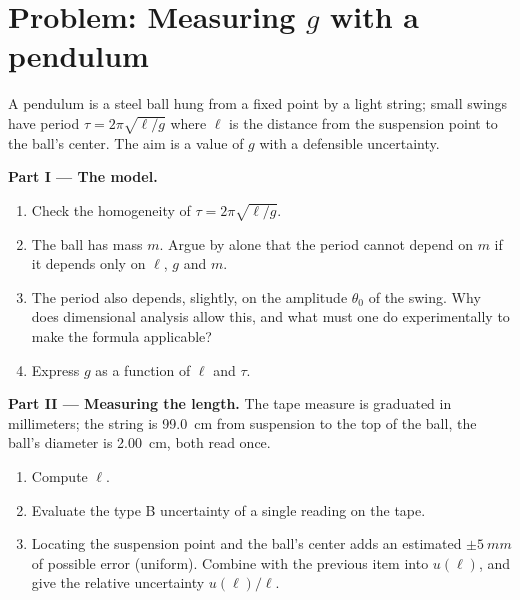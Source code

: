 \section{Problem: Measuring $g$ with a pendulum}

\begin{problem}
\label{pb:b1:units-dimensions:1}
A pendulum is a steel ball hung from a fixed point by a light string;
small swings have period $\tau = 2\pi\sqrt{\ell/g}$ where $\ell$ is the
distance from the suspension point to the ball's center. The aim is a
value of $g$ with a defensible uncertainty.

\medskip
\noindent\textbf{Part I --- The model.}
\begin{enumerate}
  \item Check the homogeneity of $\tau = 2\pi\sqrt{\ell/g}$.
  \item The ball has mass $m$. Argue by  alone that the
        period cannot depend on $m$ if it depends only on $\ell$, $g$
        and $m$.
  \item The period also depends, slightly, on the amplitude $\theta_0$
        of the swing. Why does dimensional analysis allow this, and what
        must one do experimentally to make the formula applicable?
  \item Express $g$ as a function of $\ell$ and $\tau$.
\end{enumerate}

\medskip
\noindent\textbf{Part II --- Measuring the length.}
The tape measure is graduated in millimeters; the string is
\qty{99.0}{cm} from suspension to the top of the ball, the ball's
diameter is \qty{2.00}{cm}, both read once.
\begin{enumerate}[resume]
  \item Compute $\ell$.
  \item Evaluate the type B uncertainty of a single reading on the
        tape.
  \item Locating the suspension point and the ball's center adds an
        estimated $\pm\qty{5}{mm}$ of possible error (uniform). Combine
        with the previous item into $u(\ell)$, and give the relative
        uncertainty $u(\ell)/\ell$.
\end{enumerate}


\end{problem}
